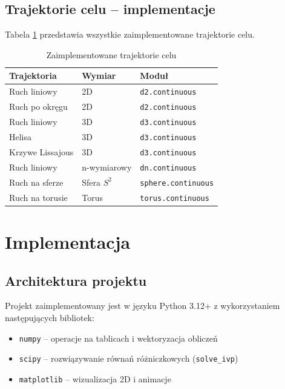 \documentclass[12pt,a4paper]{article}
\begin{document}
\subsection{Trajektorie celu -- implementacje}

Tabela \ref{tab:targets} przedstawia wszystkie zaimplementowane trajektorie celu.

\begin{table}[H]
\centering
\caption{Zaimplementowane trajektorie celu}
\label{tab:targets}
\begin{tabular}{@{}lll@{}}
\toprule
\textbf{Trajektoria} & \textbf{Wymiar} & \textbf{Moduł} \\ \midrule
Ruch liniowy & 2D & \texttt{d2.continuous} \\
Ruch po okręgu & 2D & \texttt{d2.continuous} \\
Ruch liniowy & 3D & \texttt{d3.continuous} \\
Helisa & 3D & \texttt{d3.continuous} \\
Krzywe Lissajous & 3D & \texttt{d3.continuous} \\
Ruch liniowy & n-wymiarowy & \texttt{dn.continuous} \\
Ruch na sferze & Sfera $S^2$ & \texttt{sphere.continuous} \\
Ruch na torusie & Torus & \texttt{torus.continuous} \\ \bottomrule
\end{tabular}
\end{table}

\section{Implementacja}

\subsection{Architektura projektu}

Projekt zaimplementowany jest w języku Python 3.12+ z wykorzystaniem następujących bibliotek:
\begin{itemize}
    \item \texttt{numpy} -- operacje na tablicach i wektoryzacja obliczeń
    \item \texttt{scipy} -- rozwiązywanie równań różniczkowych (\texttt{solve\_ivp})
    \item \texttt{matplotlib} -- wizualizacja 2D i animacje
\end{itemize}
\end{document}

